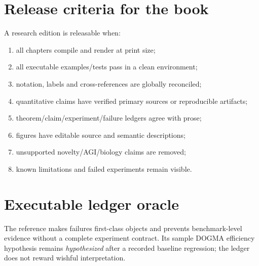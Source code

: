 \section{Release criteria for the book}
A research edition is releasable when:
\begin{enumerate}
\item all chapters compile and render at print size;
\item all executable examples/tests pass in a clean environment;
\item notation, labels and cross-references are globally reconciled;
\item quantitative claims have verified primary sources or reproducible artifacts;
\item theorem/claim/experiment/failure ledgers agree with prose;
\item figures have editable source and semantic descriptions;
\item unsupported novelty/AGI/biology claims are removed;
\item known limitations and failed experiments remain visible.
\end{enumerate}

\section{Executable ledger oracle}
The reference makes failures first-class objects and prevents benchmark-level evidence without a complete experiment contract. Its sample DOGMA efficiency hypothesis remains \emph{hypothesized} after a recorded baseline regression; the ledger does not reward wishful interpretation.

